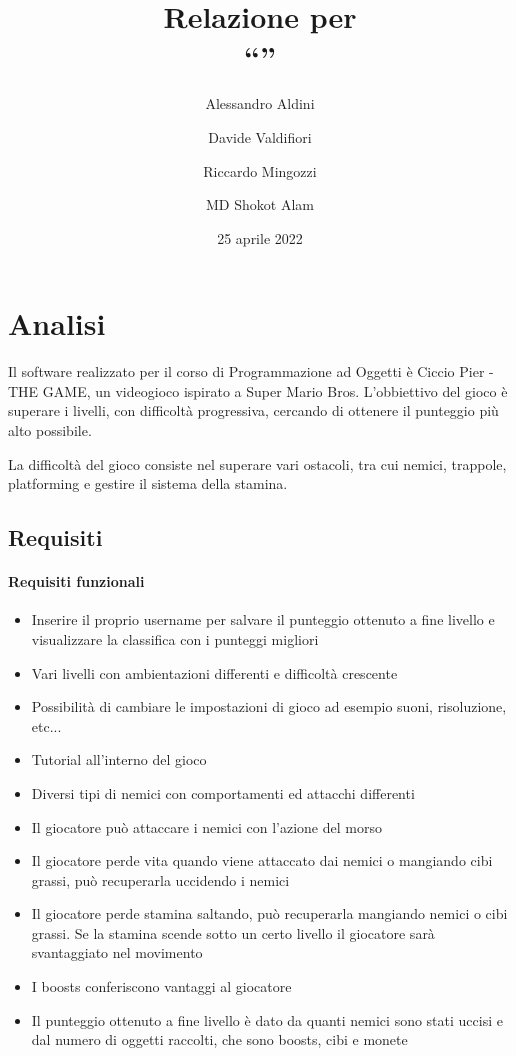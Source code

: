 \documentclass[a4paper,12pt]{report}
\title{Relazione per\\``\gametitle''}
\author{
    Alessandro Aldini
    \and
    Davide Valdifiori
    \and
    Riccardo Mingozzi
    \and
    MD Shokot Alam
}
\date{25 aprile 2022}
\newcommand{\gametitle}{Ciccio Pier - THE GAME}
\begin{document}
    \maketitle

    \tableofcontents

    \chapter{Analisi}

    Il software realizzato per il corso di Programmazione ad Oggetti è \gametitle, un videogioco ispirato a Super Mario Bros. L'obbiettivo del gioco è superare i livelli, con difficoltà progressiva, cercando di ottenere il punteggio più alto possibile.

    La difficoltà del gioco consiste nel superare vari ostacoli, tra cui nemici, trappole, platforming e gestire il sistema della stamina.

    \section{Requisiti}

    \subsubsection{Requisiti funzionali}
    \begin{itemize}
        \item Inserire il proprio username per salvare il punteggio ottenuto a fine livello e visualizzare la classifica con i punteggi migliori
        \item Vari livelli con ambientazioni differenti e difficoltà crescente
        \item Possibilità di cambiare le impostazioni di gioco ad esempio suoni, risoluzione, etc...
        \item Tutorial all'interno del gioco
        \item Diversi tipi di nemici con comportamenti ed attacchi differenti
        \item Il giocatore può attaccare i nemici con l'azione del morso
        \item Il giocatore perde vita quando viene attaccato dai nemici o mangiando cibi grassi, può recuperarla uccidendo i nemici
        \item Il giocatore perde stamina saltando, può recuperarla mangiando nemici o cibi grassi. Se la stamina scende sotto un certo livello il giocatore sarà svantaggiato nel movimento
        \item I boosts conferiscono vantaggi al giocatore
        \item Il punteggio ottenuto a fine livello è dato da quanti nemici sono stati uccisi e dal numero di oggetti raccolti, che sono boosts, cibi e monete
    \end{itemize}
\end{document}
